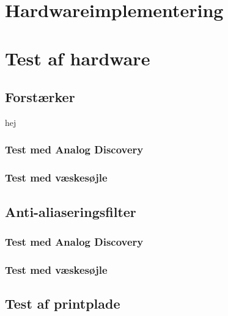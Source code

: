 \section{Hardwareimplementering}
\section{Test af hardware}
\subsection{Forstærker}
hej
\subsubsection{Test med Analog Discovery}
\subsubsection{Test med væskesøjle}
\subsection{Anti-aliaseringsfilter}
\subsubsection{Test med Analog Discovery}
\subsubsection{Test med væskesøjle}
\subsection{Test af printplade}

